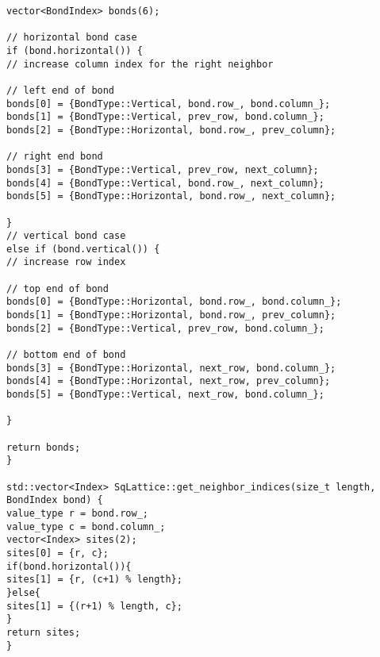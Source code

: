 \begin{lstlisting}[style=CStyle]
vector<BondIndex> bonds(6);

// horizontal bond case
if (bond.horizontal()) {
// increase column index for the right neighbor

// left end of bond
bonds[0] = {BondType::Vertical, bond.row_, bond.column_};
bonds[1] = {BondType::Vertical, prev_row, bond.column_};
bonds[2] = {BondType::Horizontal, bond.row_, prev_column};

// right end bond
bonds[3] = {BondType::Vertical, prev_row, next_column};
bonds[4] = {BondType::Vertical, bond.row_, next_column};
bonds[5] = {BondType::Horizontal, bond.row_, next_column};

}
// vertical bond case
else if (bond.vertical()) {
// increase row index

// top end of bond
bonds[0] = {BondType::Horizontal, bond.row_, bond.column_};
bonds[1] = {BondType::Horizontal, bond.row_, prev_column};
bonds[2] = {BondType::Vertical, prev_row, bond.column_};

// bottom end of bond
bonds[3] = {BondType::Horizontal, next_row, bond.column_};
bonds[4] = {BondType::Horizontal, next_row, prev_column};
bonds[5] = {BondType::Vertical, next_row, bond.column_};

}

return bonds;
}

std::vector<Index> SqLattice::get_neighbor_indices(size_t length, BondIndex bond) {
value_type r = bond.row_;
value_type c = bond.column_;
vector<Index> sites(2);
sites[0] = {r, c};
if(bond.horizontal()){
sites[1] = {r, (c+1) % length};
}else{
sites[1] = {(r+1) % length, c};
}
return sites;
}

\end{lstlisting}

